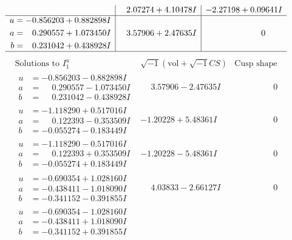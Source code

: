 \documentclass[1p]{elsarticle_modified}
\theoremstyle{definition}
\newcommand{\I}{\sqrt{-1}}
\begin{document}
$$\begin{array}{c|c|c}
 & \phantom{-}2.07274 + 4.10478 I & -2.27198 + 0.09641 I \\ \hline\begin{aligned}
u &= -0.856203 + 0.882898 I \\
a &= \phantom{-}0.290557 + 1.073450 I \\
b &= \phantom{-}0.231042 + 0.438928 I\end{aligned}
 & \phantom{-}3.57906 + 2.47635 I & \phantom{-0.000000 } 0\\
 \hline 
 \end{array}$$\newpage$$\begin{array}{c|c|c}  
\text{Solutions to }I^u_{1}& \I (\text{vol} + \sqrt{-1}CS) & \text{Cusp shape}\\
 \hline 
\begin{aligned}
u &= -0.856203 - 0.882898 I \\
a &= \phantom{-}0.290557 - 1.073450 I \\
b &= \phantom{-}0.231042 - 0.438928 I\end{aligned}
 & \phantom{-}3.57906 - 2.47635 I & \phantom{-0.000000 } 0 \\ \hline\begin{aligned}
u &= -1.118290 + 0.517016 I \\
a &= \phantom{-}0.122393 - 0.353509 I \\
b &= -0.055274 - 0.183449 I\end{aligned}
 & -1.20228 + 5.48361 I & \phantom{-0.000000 } 0 \\ \hline\begin{aligned}
u &= -1.118290 - 0.517016 I \\
a &= \phantom{-}0.122393 + 0.353509 I \\
b &= -0.055274 + 0.183449 I\end{aligned}
 & -1.20228 - 5.48361 I & \phantom{-0.000000 } 0 \\ \hline\begin{aligned}
u &= -0.690354 + 1.028160 I \\
a &= -0.438411 - 1.018090 I \\
b &= -0.341152 - 0.391855 I\end{aligned}
 & \phantom{-}4.03833 - 2.66127 I & \phantom{-0.000000 } 0 \\ \hline\begin{aligned}
u &= -0.690354 - 1.028160 I \\
a &= -0.438411 + 1.018090 I \\
b &= -0.341152 + 0.391855 I\end{aligned}

\end{array}$$
\end{document}
